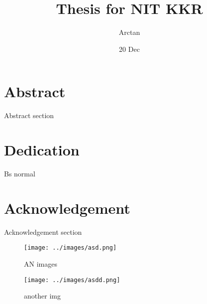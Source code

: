 \documentclass{report}
\title{Thesis for \Large{NIT KKR}}
\author{Arctan}
\date{20 Dec}
\begin{document}
\maketitle    

\chapter*{Abstract}
Abstract section

\chapter*{Dedication}
Bs normal 


\chapter*{Acknowledgement}
Acknowledgement section

\tableofcontents

\begin{figure}[h]
    \centering
    \texttt{[image: ../images/asd.png]}
    \caption{AN images}
    \label{fig:img1}
\end{figure}



\begin{figure*}
    \centering
    \texttt{[image: ../images/asdd.png]}
    \caption{another img}
    \label{fig:img2}
\end{figure*}


\appendix

\end{document}
